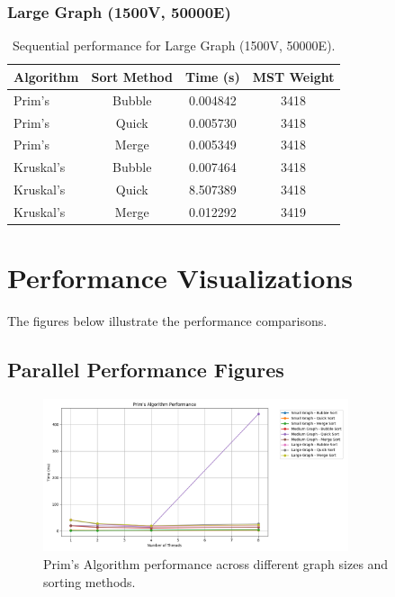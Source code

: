 \documentclass[11pt]{article}
\begin{document}
\subsubsection*{Large Graph (1500V, 50000E)}
\begin{table}[H]
    \centering
    \begin{tabular}{lccc}
        \toprule
        \textbf{Algorithm} & \textbf{Sort Method} & \textbf{Time (s)} & \textbf{MST Weight} \\
        \midrule
        Prim's    & Bubble & 0.004842 & 3418 \\
        Prim's    & Quick  & 0.005730 & 3418 \\
        Prim's    & Merge  & 0.005349 & 3418 \\
        \midrule
        Kruskal's & Bubble & 0.007464 & 3418 \\
        Kruskal's & Quick  & 8.507389 & 3418 \\
        Kruskal's & Merge  & 0.012292 & 3419 \\
        \bottomrule
    \end{tabular}
    \caption{Sequential performance for Large Graph (1500V, 50000E).}
    \label{tab:large_seq}
\end{table}

\section{Performance Visualizations}
The figures below illustrate the performance comparisons.

\subsection{Parallel Performance Figures}
\begin{figure}[H]
    \centering
    \includegraphics[width=0.8\textwidth]{prims_comparison.png}
    \caption{Prim's Algorithm performance across different graph sizes and sorting methods.}
    \label{fig:prims_comparison}
\end{figure}
\end{document}
